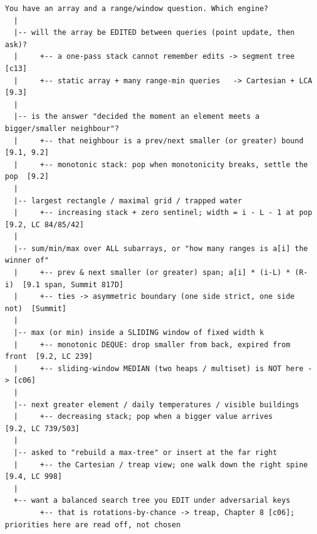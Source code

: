 \begin{lstlisting}[language={}, basicstyle=\ttfamily\small, numbers=none, frame=single]
  You have an array and a range/window question. Which engine?
  |
  |-- will the array be EDITED between queries (point update, then ask)?
  |     +-- a one-pass stack cannot remember edits -> segment tree [c13]
  |     +-- static array + many range-min queries   -> Cartesian + LCA [9.3]
  |
  |-- is the answer "decided the moment an element meets a bigger/smaller neighbour"?
  |     +-- that neighbour is a prev/next smaller (or greater) bound  [9.1, 9.2]
  |     +-- monotonic stack: pop when monotonicity breaks, settle the pop  [9.2]
  |
  |-- largest rectangle / maximal grid / trapped water
  |     +-- increasing stack + zero sentinel; width = i - L - 1 at pop   [9.2, LC 84/85/42]
  |
  |-- sum/min/max over ALL subarrays, or "how many ranges is a[i] the winner of"
  |     +-- prev & next smaller (or greater) span; a[i] * (i-L) * (R-i)  [9.1 span, Summit 817D]
  |     +-- ties -> asymmetric boundary (one side strict, one side not)  [Summit]
  |
  |-- max (or min) inside a SLIDING window of fixed width k
  |     +-- monotonic DEQUE: drop smaller from back, expired from front  [9.2, LC 239]
  |     +-- sliding-window MEDIAN (two heaps / multiset) is NOT here -> [c06]
  |
  |-- next greater element / daily temperatures / visible buildings
  |     +-- decreasing stack; pop when a bigger value arrives            [9.2, LC 739/503]
  |
  |-- asked to "rebuild a max-tree" or insert at the far right
  |     +-- the Cartesian / treap view; one walk down the right spine     [9.4, LC 998]
  |
  +-- want a balanced search tree you EDIT under adversarial keys
        +-- that is rotations-by-chance -> treap, Chapter 8 [c06]; priorities here are read off, not chosen
\end{lstlisting}



